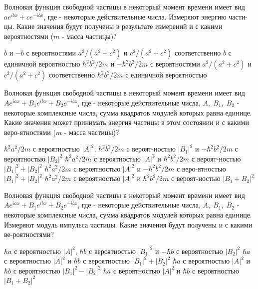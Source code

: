 \documentclass[11pt,a4paper]{exam}
\begin{document}
\begin{questions}
\question Волновая функция свободной частицы в некоторый момент времени имеет вид $a{e^{ibx}} + c{e^{ - ibx}}$, где  - некоторые действительные числа. Измеряют энергию части-цы. Какие значения будут получены в результате измерений и с какими вероятностями ($m$ - масса частицы)?
\begin{choices}
\choice $b$ и $ - b$ с вероятностями ${a^2}/({a^2} + {c^2})$ и ${c^2}/({a^2} + {c^2})$ соответственно
\choice $b$ с единичной вероятностью
\choice ${\hbar ^2}{b^2}/2m$ и $ - {\hbar ^2}{b^2}/2m$ с вероятностями ${a^2}/({a^2} + {c^2})$ и ${c^2}/({a^2} + {c^2})$ соответственно
\choice ${\hbar ^2}{b^2}/2m$ с единичной вероятностью 
\end{choices}

\question Волновая функция свободной частицы в некоторый момент времени имеет вид $A{e^{iax}} + {B_1}{e^{ibx}} + {B_2}{e^{ - ibx}}$, где  - некоторые действительные числа, $A,\;{B_1},\;{B_2}$ - некоторые комплексные числа, сумма квадратов модулей которых равна единице. Какие значения может принимать энергия частицы в этом состоянии и с какими веро-ятностями ($m$ - масса частицы)?
\begin{choices}
\choice ${\hbar ^2}{a^2}/2m$ с вероятностью ${\left| A \right|^2}$, ${\hbar ^2}{b^2}/2m$ с вероят-ностью ${\left| {{B_1}} \right|^2}$ и $ - {\hbar ^2}{b^2}/2m$ с вероятностью ${\left| {{B_2}} \right|^2}$
\choice ${\hbar ^2}{a^2}/2m$ с вероятностью ${\left| A \right|^2}$ и ${\hbar ^2}{b^2}/2m$ с вероят-ностью ${\left| {{B_1}} \right|^2} + {\left| {{B_2}} \right|^2}$
\choice ${\hbar ^2}{a^2}/2m$ с вероятностью ${\left| A \right|^2}$ и $ - {\hbar ^2}{b^2}/2m$ с веро-ятностью ${\left| {{B_1}} \right|^2} + {\left| {{B_2}} \right|^2}$
\choice ${\hbar ^2}{a^2}/2m$ с вероятностью ${\left| A \right|^2}$ и ${\hbar ^2}{b^2}/2m$ с вероят-ностью ${\left| {{B_1} + {B_2}} \right|^2}$ 
\end{choices}

\question Волновая функция свободной частицы в некоторый момент времени имеет вид $A{e^{iax}} + {B_1}{e^{ibx}} + {B_2}{e^{ - ibx}}$, где  - некоторые действительные числа, $A,\;{B_1},\;{B_2}$ - некоторые комплексные числа, сумма квадратов модулей которых равна единице. Измеряют модуль импульса частицы. Какие значения будут получены и с какими ве-роятностями?
\begin{choices}
\choice $\hbar a$ с вероятностью ${\left| A \right|^2}$, $\hbar b$ с вероятностью ${\left| {{B_1}} \right|^2}$ и $ - \hbar b$ с вероятностью ${\left| {{B_2}} \right|^2}$
\choice $\hbar a$ с вероятностью ${\left| A \right|^2}$ и $\hbar b$ с вероятностью ${\left| {{B_1}} \right|^2} + {\left| {{B_2}} \right|^2}$
\choice $\hbar a$ с вероятностью ${\left| A \right|^2}$ и $\hbar b$ с вероятностью ${\left| {{B_1}} \right|^2} - {\left| {{B_2}} \right|^2}$
\choice $\hbar a$ с вероятностью ${\left| A \right|^2}$ и $\hbar b$ с вероятностью ${\left| {{B_1} + {B_2}} \right|^2}$ 
\end{choices}


\end{questions}
\end{document}

